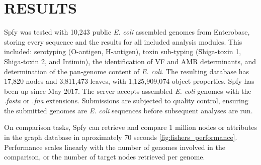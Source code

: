 \documentclass{article}
\begin{document}
\section{RESULTS}
Spfy was tested with 10,243 public \textit{E. coli} assembled genomes from Enterobase, storing every sequence and the results for all included analysis modules. This included: serotyping (O-antigen, H-antigen), toxin sub-typing (Shiga-toxin 1, Shiga-toxin 2, and Intimin), the identification of VF and AMR determinants, and determination of the pan-genome content of \textit{E. coli}.
The resulting database has 17,820 nodes and 3,811,473 leaves, with 1,125,909,074 object properties.
Spfy has been up since May 2017. The server accepts assembled \textit{E. coli} genomes with the \textit{.fasta} or \textit{.fna} extensions. Submissions are subjected to quality control, ensuring the submitted genomes are \textit{E. coli} sequences before subsequent analyses are run.
\par


On comparison tasks, Spfy can retrieve and compare 1 million nodes or attributes in the graph database in aproximately 70 seconds \ref{fig:fishers_performance}.
Performance scales linearly with the number of genomes involved in the comparison, or the number of target nodes retrieved per genome.
\end{document}
